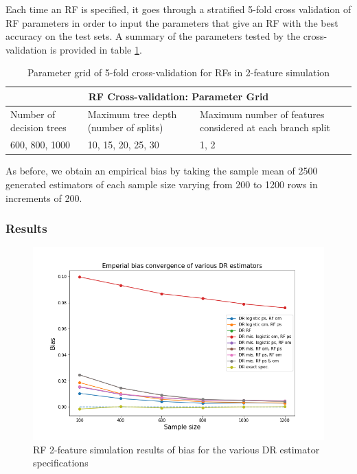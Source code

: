 \documentclass[12pt,twoside]{article}
\begin{document}
Each time an RF is specified, it goes through a stratified 5-fold cross validation of RF parameters in order to input the parameters that give an RF with the best accuracy on the test sets. A summary of the parameters tested by the cross-validation is provided in table \ref{tableRF}.\\
\begin{table}[]
    \centering
\begin{tabular}{ |p{3cm}|p{3cm}|p{3cm}| }
 \hline
 \multicolumn{3}{|c|}{RF Cross-validation: Parameter Grid} \\
 \hline
 Number of decision trees & Maximum tree depth (number of splits)  & Maximum    number of features considered at each branch split\\
 \hline
 600, 800, 1000& 10, 15, 20, 25, 30 & 1, 2 \\
 \hline 
\end{tabular}
\caption{Parameter grid of 5-fold cross-validation for RFs in 2-feature simulation}
\label{tableRF}
\end{table}

As before, we obtain an empirical bias by taking the sample mean of 2500 generated estimators of each sample size varying from 200 to 1200 rows in increments of 200. 

\subsubsection*{Results}

\begin{figure}[h!]
    \centering
    \includegraphics[width = 0.9\columnwidth]{figures/biasRF.png}
    \caption{RF 2-feature simulation results of bias for the various DR estimator specifications}
    \label{figbiasRF}
\end{figure}
\end{document}
